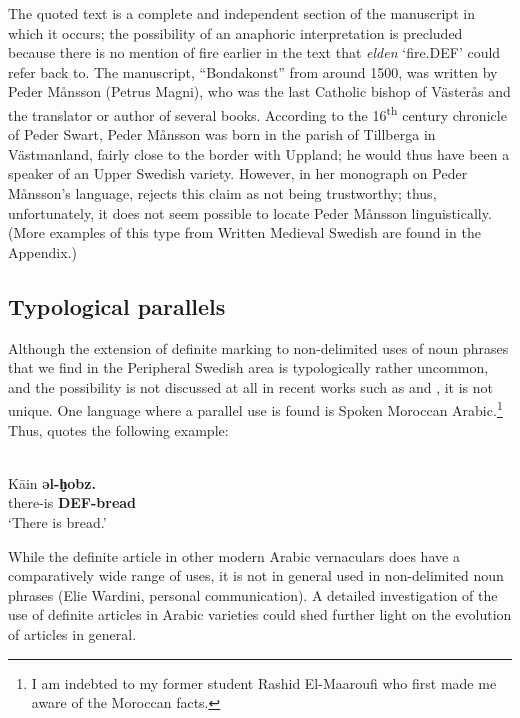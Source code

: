 \z

The quoted text is a complete and independent section of the manuscript in which it occurs; the possibility of an anaphoric interpretation is precluded because there is no mention of fire earlier in the text that \textit{elden} ‘fire.DEF’ could refer back to. The manuscript, “Bondakonst” from around 1500, was written by Peder Månsson (Petrus Magni), who was the last Catholic bishop of Västerås and the translator or author of several books. According to the 16\textsuperscript{th} century chronicle of Peder Swart, Peder Månsson was born in the parish of Tillberga in Västmanland, fairly close to the border with Uppland; he would thus have been a speaker of an Upper Swedish variety. However, in her monograph on Peder Månsson’s language, \citet[51]{Nordling2001} rejects this claim as not being trustworthy; thus, unfortunately, it does not seem possible to locate Peder Månsson linguistically. (More examples of this type from Written Medieval Swedish are found in the Appendix.) 

\subsection{ Typological parallels}
\label{bkm:Ref134937864}

Although the extension of definite marking to non-delimited uses of noun phrases that we find in the Peripheral Swedish area is typologically rather uncommon, and the possibility is not discussed at all in recent works such as \citet{Himmelmann1997} and \citet{Lyons1999}, it is not unique. One language where a parallel use is found is Spoken Moroccan Arabic.\footnote{ I am indebted to my former student Rashid El-Maaroufi who first made me aware of the Moroccan facts. } Thus, \citet[235]{Caubet1983} quotes the following example:

\ea
{}\\
\gll K\=ain  \textbf{əl-h̬obz.} \\
there-is  \textbf{DEF-bread}\\
\glt ‘There is bread.’

\z

While the definite article in other modern Arabic vernaculars does have a comparatively wide range of uses, it is not in general used in non-delimited noun phrases (Elie Wardini, personal communication). A detailed investigation of the use of definite articles in Arabic varieties could shed further light on the evolution of articles in general.

